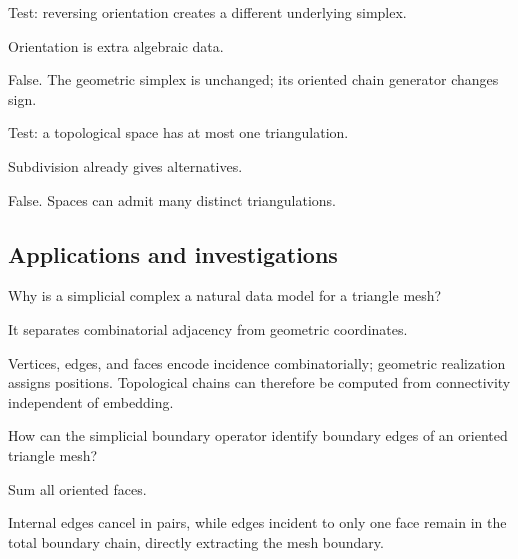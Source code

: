 \begin{exercise}\label{exr:viii15-ped-11}
Test: reversing orientation creates a different underlying simplex.
\end{exercise}
\begin{hint}
Orientation is extra algebraic data.
\end{hint}
\begin{solution}
False. The geometric simplex is unchanged; its oriented chain generator changes sign.
\end{solution}

\begin{exercise}\label{exr:viii15-ped-12}
Test: a topological space has at most one triangulation.
\end{exercise}
\begin{hint}
Subdivision already gives alternatives.
\end{hint}
\begin{solution}
False. Spaces can admit many distinct triangulations.
\end{solution}

\subsection*{Applications and investigations}

\begin{exercise}\label{exr:viii15-ped-13}
Why is a simplicial complex a natural data model for a triangle mesh?
\end{exercise}
\begin{hint}
It separates combinatorial adjacency from geometric coordinates.
\end{hint}
\begin{solution}
Vertices, edges, and faces encode incidence combinatorially; geometric realization assigns positions.  Topological chains can therefore be computed from connectivity independent of embedding.
\end{solution}

\begin{exercise}\label{exr:viii15-ped-14}
How can the simplicial boundary operator identify boundary edges of an oriented triangle mesh?
\end{exercise}
\begin{hint}
Sum all oriented faces.
\end{hint}
\begin{solution}
Internal edges cancel in pairs, while edges incident to only one face remain in the total boundary chain, directly extracting the mesh boundary.
\end{solution}

